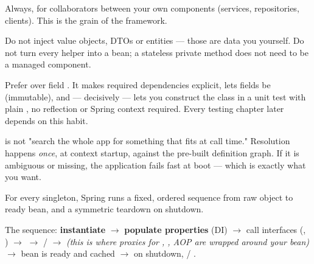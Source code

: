  Always, for collaborators between your own components (services, repositories, clients). This is the grain of the framework.

 Do not inject value objects, DTOs or entities — those are data you  yourself. Do not turn every helper into a bean; a stateless private method does not need to be a managed component.

\begin{prodtip}
Prefer  over field . It makes required dependencies explicit, lets fields be  (immutable), and — decisively — lets you construct the class in a unit test with plain , no reflection or Spring context required. Every testing chapter later depends on this habit.
\end{prodtip}

\begin{misconception}
 is not "search the whole app for something that fits at call time." Resolution happens \emph{once}, at context startup, against the pre-built definition graph. If it is ambiguous or missing, the application fails fast at boot — which is exactly what you want.
\end{misconception}


 For every singleton, Spring runs a fixed, ordered sequence from raw object to ready bean, and a symmetric teardown on shutdown.

 The sequence: \textbf{instantiate} $\rightarrow$ \textbf{populate properties} (DI) $\rightarrow$ call  interfaces (, ) $\rightarrow$  $\rightarrow$  /  $\rightarrow$  \emph{(this is where proxies for , , AOP are wrapped around your bean)} $\rightarrow$ bean is ready and cached $\rightarrow$ on shutdown,  / .


